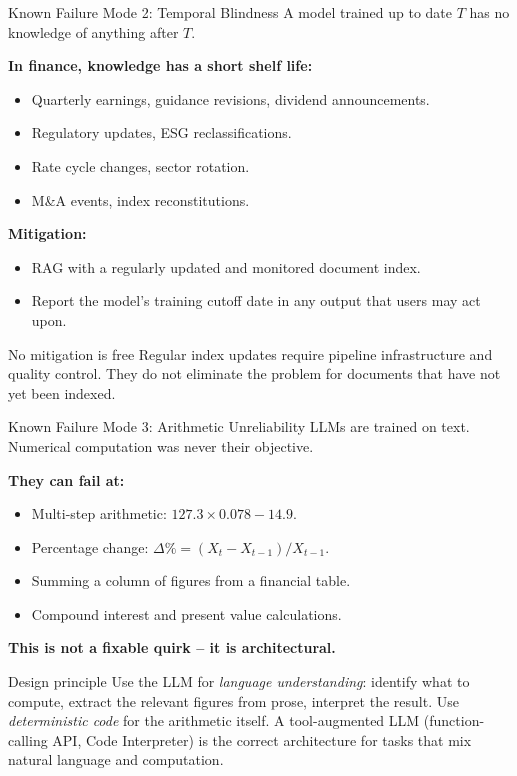 \documentclass[11pt,aspectratio=169,professionalfonts]{beamer}
\begin{document}
\begin{frame}{Known Failure Mode 2: Temporal Blindness}
  A model trained up to date $T$ has no knowledge of anything after $T$.

  \medskip
  \textbf{In finance, knowledge has a short shelf life:}
  \begin{itemize}
    \item Quarterly earnings, guidance revisions, dividend announcements.
    \item Regulatory updates, ESG reclassifications.
    \item Rate cycle changes, sector rotation.
    \item M\&A events, index reconstitutions.
  \end{itemize}

  \vspace{0.3em}
  \textbf{Mitigation:}
  \begin{itemize}
    \item RAG with a regularly updated and monitored document index.
    \item Report the model's training cutoff date in any output
          that users may act upon.
  \end{itemize}

  \begin{alertblock}{No mitigation is free}
    Regular index updates require pipeline infrastructure and quality
    control.
    They do not eliminate the problem for documents that have not
    yet been indexed.
  \end{alertblock}
\end{frame}
%
%
\begin{frame}{Known Failure Mode 3: Arithmetic Unreliability}
  LLMs are trained on text.
  Numerical computation was never their objective.

  \medskip
  \textbf{They can fail at:}
  \begin{itemize}
    \item Multi-step arithmetic: $127.3 \times 0.078 - 14.9$.
    \item Percentage change: $\Delta\% = (X_t - X_{t-1})/X_{t-1}$.
    \item Summing a column of figures from a financial table.
    \item Compound interest and present value calculations.
  \end{itemize}

  \vspace{0.3em}
  \textbf{This is not a fixable quirk -- it is architectural.}

  \begin{alertblock}{Design principle}
    Use the LLM for \emph{language understanding}: identify what to compute,
    extract the relevant figures from prose, interpret the result.
    Use \emph{deterministic code} for the arithmetic itself.
    A tool-augmented LLM (function-calling API, Code Interpreter) is the
    correct architecture for tasks that mix natural language and computation.
  \end{alertblock}
\end{frame}
\end{document}
